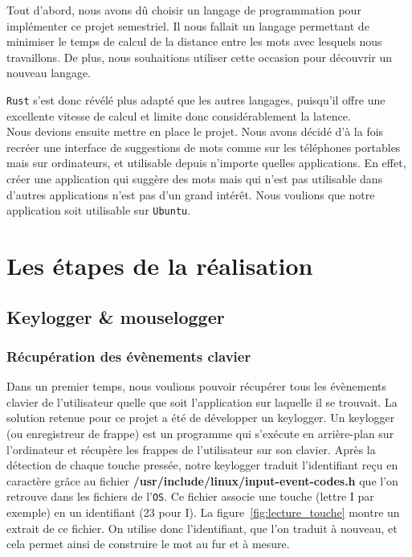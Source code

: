\documentclass[a4paper, 11pt]{report}
\newcommand{\langage}[1]{\texttt{#1}}
\begin{document}
Tout d'abord, nous avons dû choisir un langage de programmation pour implémenter ce projet semestriel. Il nous fallait un langage permettant de minimiser le temps de calcul de la distance entre les mots avec lesquels nous travaillons. De plus, nous souhaitions utiliser cette occasion pour découvrir un nouveau langage.~{\langage{Rust} s’est donc révélé plus adapté que les autres langages, puisqu’il offre une excellente vitesse de calcul et limite donc considérablement la latence.\\

Nous devions ensuite mettre en place le projet. Nous avons décidé d'à la fois recréer une interface de suggestions de mots comme sur les téléphones portables mais sur ordinateurs, et utilisable depuis n'importe quelles applications. En effet, créer une application qui suggère des mots mais qui n'est pas utilisable dans d'autres applications n'est pas d'un grand intérêt. Nous voulions que notre application soit utilisable sur \langage{Ubuntu}.

\section{Les étapes de la réalisation}

\subsection{Keylogger \& mouselogger}

\subsubsection{Récupération des évènements clavier}

Dans un premier temps, nous voulions pouvoir récupérer tous les évènements clavier de l'utilisateur quelle que soit l'application sur laquelle il se trouvait. La solution retenue pour ce projet a été de développer un keylogger. Un keylogger (ou enregistreur de frappe) est un programme qui s’exécute en arrière-plan sur l'ordinateur et récupère les frappes de l’utilisateur sur son clavier. Après la détection de chaque touche pressée, notre keylogger traduit l'identifiant reçu en caractère grâce au fichier \textbf{/usr/include/linux/input-event-codes.h} que l'on retrouve dans les fichiers de l'\langage{OS}. Ce fichier associe une touche (lettre I par exemple) en un identifiant (23 pour I). La figure~\ref{fig:lecture_touche} montre un extrait de ce fichier. On utilise donc l'identifiant, que l'on traduit à nouveau, et cela permet ainsi de construire le mot au fur et à mesure. \\

}
\end{document}
